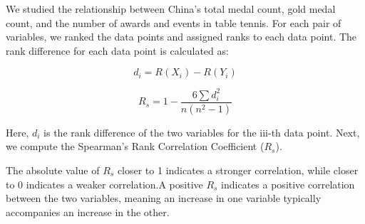\documentclass[12pt]{article}  %
\begin{document}
We studied the relationship between China's total medal count, gold medal count, and the number of awards and events in table tennis. For each pair of variables, we ranked the data points and assigned ranks to each data point. The rank difference for each data point is calculated as:

\begin{equation}
	d_i = R(X_i) - R(Y_i)
\end{equation}

\begin{equation}
	R_s = 1 - \frac{6 \sum d_i^2}{n(n^2 - 1)}
\end{equation}


Here, $d_i$ is the rank difference of the two variables for the iii-th data point. 
Next, we compute the Spearman's Rank Correlation Coefficient ($R_s$). 

The absolute value of $R_s$ closer to 1 indicates a stronger correlation, while closer to 0 indicates a weaker correlation.A positive $R_s$ indicates a positive correlation between the two variables, meaning an increase in one variable typically accompanies an increase in the other. 
\end{document}
